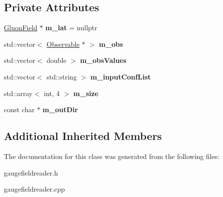 \subsection*{Private Attributes}
\begin{DoxyCompactItemize}
\item 
\hyperlink{classField}{Gluon\+Field} $\ast$ {\bfseries m\+\_\+lat} = nullptr\hypertarget{classGaugeFieldReader_a5463d397d298c410b7a22d5f5b4a479e}{}\label{classGaugeFieldReader_a5463d397d298c410b7a22d5f5b4a479e}

\item 
std\+::vector$<$ \hyperlink{classObservable}{Observable} $\ast$ $>$ {\bfseries m\+\_\+obs}\hypertarget{classGaugeFieldReader_a754535c031598fef45833888e9979fe1}{}\label{classGaugeFieldReader_a754535c031598fef45833888e9979fe1}

\item 
std\+::vector$<$ double $>$ {\bfseries m\+\_\+obs\+Values}\hypertarget{classGaugeFieldReader_aeda178d621e12f56a9c377385bb1be0e}{}\label{classGaugeFieldReader_aeda178d621e12f56a9c377385bb1be0e}

\item 
std\+::vector$<$ std\+::string $>$ {\bfseries m\+\_\+input\+Conf\+List}\hypertarget{classGaugeFieldReader_a92c2a16c7ea8d99a156f8bf721cbd3cf}{}\label{classGaugeFieldReader_a92c2a16c7ea8d99a156f8bf721cbd3cf}

\item 
std\+::array$<$ int, 4 $>$ {\bfseries m\+\_\+size}\hypertarget{classGaugeFieldReader_ae82df049657776beb85fc3bbb36dad4e}{}\label{classGaugeFieldReader_ae82df049657776beb85fc3bbb36dad4e}

\item 
const char $\ast$ {\bfseries m\+\_\+out\+Dir}\hypertarget{classGaugeFieldReader_a2094749f83fd803ccc01e477aaa482e7}{}\label{classGaugeFieldReader_a2094749f83fd803ccc01e477aaa482e7}

\end{DoxyCompactItemize}
\subsection*{Additional Inherited Members}


The documentation for this class was generated from the following files\+:\begin{DoxyCompactItemize}
\item 
gaugefieldreader.\+h\item 
gaugefieldreader.\+cpp\end{DoxyCompactItemize}
